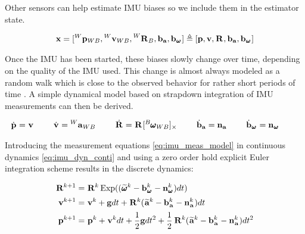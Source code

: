 Other sensors can help estimate IMU biases so we include them in the estimator state.

\begin{equation}
    {\bf x} = [\prescript{W}{}{{\bf p}}_{WB}, \prescript{W}{}{{\bf v}}_{WB}, \prescript{W}{}{{\bf R}}_{B}, {\bf b}_{{\bf a}}, {\bf b}_{\prescript{}{}{\pmb{\omega}}_{}}]
    \triangleq 
    [{\bf p}, {\bf v}, \prescript{}{}{{\bf R}}_{}, {\bf b}_{{\bf a}}, {\bf b}_{\prescript{}{}{\pmb{\omega}}_{}}] 
\end{equation}

Once the IMU has been started, these biases slowly change over time, depending on the quality of the IMU used. This change is almost always modeled 
as a random walk which is close to the observed behavior for rather short periods of time \cite{hussen2015low}. A simple dynamical model based on strapdown integration of IMU measurements can then be derived.

\begin{equation}
    \begin{split}
    \dot{\prescript{}{}{{\bf p}}_{}} = \prescript{}{}{{\bf v}}_{}  ~~~~~~~
    \dot{\prescript{}{}{{\bf v}}_{}} = \prescript{W}{}{{\bf a}}_{WB} ~~~~~~~
    \dot{\prescript{}{}{{\bf R}}_{}} = \prescript{}{}{{\bf R}}_{} [\prescript{B}{}{\pmb{\omega}}_{WB}]_{\times} ~~~~~~~
    \dot{{\bf b}}_{{\bf a}} = {\bf n}_{{\bf a}}  ~~~~~~~
    \dot{{\bf b}}_{\prescript{}{}{\pmb{\omega}}_{}} = {\bf n}_{\prescript{}{}{\pmb{\omega}}_{}} ~~~~~~~
    \end{split}
    \label{eq:imu_dyn_conti}
\end{equation}

Introducing the measurement equations \ref{eq:imu_meas_model} in continuous dynamics \ref{eq:imu_dyn_conti} and using a zero order hold
explicit Euler integration scheme results in the discrete dynamics:

\begin{equation}
    \begin{split}
    \prescript{}{}{{\bf R}}_{}^{k+1}  &= \prescript{}{}{{\bf R}}_{}^{k}\operatorname*{Exp}((\prescript{}{}{\widetilde{\pmb{\omega}}}_{}^k - {\bf b}_{\prescript{}{}{\pmb{\omega}}_{}}^k - {\bf n}_{\prescript{}{}{\pmb{\omega}}_{}}^k)dt)
    \\
    \prescript{}{}{{\bf v}}_{}^{k+1}  &= \prescript{}{}{{\bf v}}_{}^{k} + {\bf g} dt + \prescript{}{}{{\bf R}}_{}^{k}(\prescript{}{}{\widetilde{{\bf a}}}_{}^k - {\bf b}_{\prescript{}{}{{\bf a}}_{}}^k - {\bf n}_{\prescript{}{}{{\bf a}}_{}}^k)dt
    \\
    \prescript{}{}{{\bf p}}_{}^{k+1} &= \prescript{}{}{{\bf p}}_{}^{k} + \prescript{}{}{{\bf v}}_{}^{k}dt + \frac{1}{2}{\bf g} dt^2 
    + \frac{1}{2}\prescript{}{}{{\bf R}}_{}^{k}(\prescript{}{}{\widetilde{{\bf a}}}_{}^k - {\bf b}_{\prescript{}{}{{\bf a}}_{}}^k - {\bf n}_{\prescript{}{}{{\bf a}}_{}}^k)dt^2
    \end{split}
    \label{eq:imu_dyn_disc}
\end{equation}
    
